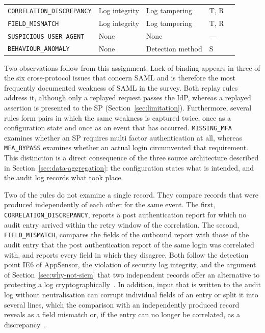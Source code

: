 \documentclass[../main.tex]{subfiles}
\begin{document}
\begin{table}[h]
\begin{tabular}{>{\raggedright\arraybackslash}p{3.3cm}>{\raggedright\arraybackslash}p{2.7cm}>{\raggedright\arraybackslash}p{2.4cm}p{1.3cm}l}
\texttt{CORRELATION\_\allowbreak{}DISCREPANCY}                    & Log integrity              & Log tampering            & T, R    & \cite{OWASPAppSensor,OWASPA09,CWE117} \\
\texttt{FIELD\_\allowbreak{}MISMATCH}                             & Log integrity              & Log tampering            & T, R    & \cite{OWASPAppSensor,OWASPA09,CWE117} \\
\texttt{SUSPICIOUS\_\allowbreak{}USER\_\allowbreak{}AGENT}        & None                       & None                     & ---     & \cite{OWASPAppSensor} \\
\texttt{BEHAVIOUR\_\allowbreak{}ANOMALY}                          & None                       & Detection method         & S       & \cite{OWASPAppSensor} \\
\bottomrule
\end{tabular}
\end{table}

Two observations follow from this assignment. 
Lack of binding appears in three of the six cross-protocol issues that concern SAML and is therefore 
the most frequently documented weakness of SAML in the survey. 
Both replay rules address it, although only a replayed request passes the IdP, whereas a replayed 
assertion is presented to the SP (Section~\ref{sec:limitation}). 
Furthermore, several rules form pairs in which the same weakness is captured twice, once as a 
configuration state and once as an event that has occurred. 
\texttt{MISSING\_\allowbreak{}MFA} examines whether an SP requires multi factor authentication at all, whereas 
\texttt{MFA\_\allowbreak{}BYPASS} examines whether an actual login circumvented that requirement. 
This distinction is a direct consequence of the three source architecture described in 
Section~\ref{sec:data-aggregation}: the configuration states what is intended, and the audit log 
records what took place.

Two of the rules do not examine a single record. 
They compare records that were produced independently of each other for the same event. 
The first, \texttt{CORRELATION\_\allowbreak{}DISCREPANCY}, reports a post authentication report for which no 
audit entry arrived within the retry window of the correlation. 
The second, \texttt{FIELD\_\allowbreak{}MISMATCH}, compares the fields of the outbound report with those of the 
audit entry that the post authentication report of the same login was correlated with, and reports 
every field in which they disagree. 
Both follow the detection point IE6 of AppSensor, the violation of security log integrity, and the 
argument of Section~\ref{sec:why-not-siem} that two independent records offer an alternative to 
protecting a log cryptographically~\cite{OWASPAppSensor}. 
In addition, input that is written to the audit log without neutralisation can corrupt individual 
fields of an entry or split it into several lines, which the comparison with an independently 
produced record reveals as a field mismatch or, if the entry can no longer be correlated, as a 
discrepancy~\cite{CWE117}. 
 
\end{document}
